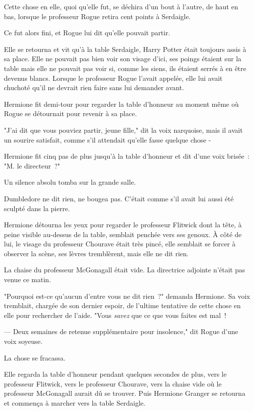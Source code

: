 Cette chose en elle, quoi qu'elle fut, se déchira d'un bout à l'autre, de haut en bas, lorsque le professeur Rogue retira cent points à Serdaigle.

Ce fut alors fini, et Rogue lui dit qu'elle pouvait partir.

Elle se retourna et vit qu'à la table Serdaigle, Harry Potter était toujours assis à sa place. Elle ne pouvait pas bien voir son visage d'ici, ses poings étaient sur la table mais elle ne pouvait pas voir si, comme les siens, ils étaient serrés à en être devenus blancs. Lorsque le professeur Rogue l'avait appelée, elle lui avait chuchoté qu'il ne devrait rien faire sans lui demander avant.

Hermione fit demi-tour pour regarder la table d'honneur au moment même où Rogue se détournait pour revenir à sa place.

"J'ai dit que vous pouviez partir, jeune fille," dit la voix narquoise, mais il avait un sourire satisfait, comme s'il attendait qu'elle fasse quelque chose -

Hermione fit cinq pas de plus jusqu'à la table d'honneur et dit d'une voix brisée~: "M. le directeur~?"

Un silence absolu tomba sur la grande salle.

Dumbledore ne dit rien, ne bougea pas. C'était comme s'il avait lui aussi été sculpté dans la pierre.

Hermione détourna les yeux pour regarder le professeur Flitwick dont la tête, à peine visible au-dessus de la table, semblait penchée vers ses genoux. À côté de lui, le visage du professeur Chourave était très pincé, elle semblait se forcer à observer la scène, ses lèvres tremblèrent, mais elle ne dit rien.

La chaise du professeur McGonagall était vide. La directrice adjointe n'était pas venue ce matin.

"Pourquoi est-ce qu'aucun d'entre vous ne dit rien~?" demanda Hermione. Sa voix tremblait, chargée de son dernier espoir, de l'ultime tentative de cette chose en elle pour rechercher de l'aide. "Vous \emph{savez} que ce que vous faites est mal~!

--- Deux semaines de retenue supplémentaire pour insolence," dit Rogue d'une voix soyeuse.

La chose se fracassa.

Elle regarda la table d'honneur pendant quelques secondes de plus, vers le professeur Flitwick, vers le professeur Chourave, vers la chaise vide où le professeur McGonagall aurait dû se trouver. Puis Hermione Granger se retourna et commença à marcher vers la table Serdaigle.

